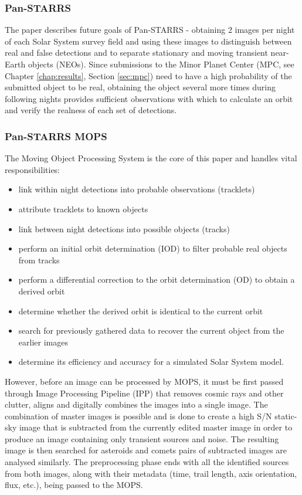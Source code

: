 \subsubsection{Pan-STARRS}
	
	The paper describes future goals of Pan-STARRS - obtaining 2 images per night of each Solar System survey field and using these images to distinguish between real and false detections and to separate stationary and moving transient near-Earth objects (NEOs). Since submissions to the Minor Planet Center (MPC, see Chapter \ref{chap:results}, Section \ref{sec:mpc}) need to have a high probability of the submitted object to be real, obtaining the object several more times during following nights provides sufficient observations with which to calculate an orbit and verify the realness of each set of detections.
	
\subsubsection{Pan-STARRS MOPS}

	The Moving Object Processing System is the core of this paper and handles vital responsibilities:
	
	\begin{itemize}
		\item link within night detections into probable observations (tracklets)
		\item attribute tracklets to known objects
		\item link between night detections into possible objects (tracks)
		\item perform an initial orbit determination (IOD) to filter probable real objects from tracks
		\item perform a differential correction to the orbit determination (OD) to obtain a derived orbit
		\item determine whether the derived orbit is identical to the current orbit
		\item search for previously gathered data to recover the current object from the earlier images
		\item determine its efficiency and accuracy for a simulated Solar System model.
	\end{itemize}
	
	However, before an image can be processed by MOPS, it must be first passed through Image Processing Pipeline (IPP) that removes cosmic rays and other clutter, aligns and digitally combines the images into a single image. The combination of master images is possible and is done to create a high S/N static-sky image that is subtracted from the currently edited master image in order to produce an image containing only transient sources and noise. The resulting image is then searched for asteroids and comets\; pairs of subtracted images are analysed similarly. The preprocessing phase ends with all the identified sources from both images, along with their metadata (time, trail length, axis orientation, flux, etc.), being passed to the MOPS.
	

